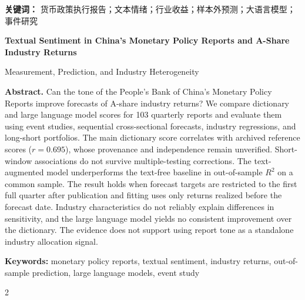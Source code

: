\documentclass[UTF8,zihao=-4,fontset=fandol,a4paper]{ctexart}
\begin{document}
\noindent\textbf{关键词：} 货币政策执行报告；文本情绪；行业收益；样本外预测；大语言模型；事件研究

\vspace{0.9em}
\begin{center}
  {\large\bfseries Textual Sentiment in China's Monetary Policy Reports and A-Share Industry Returns}\par
  \vspace{0.2em}
  {\normalsize Measurement, Prediction, and Industry Heterogeneity}
\end{center}
\noindent\textbf{Abstract.}
Can the tone of the People's Bank of China's Monetary Policy Reports improve forecasts of A-share industry returns? We compare dictionary and large language model scores for 103 quarterly reports and evaluate them using event studies, sequential cross-sectional forecasts, industry regressions, and long-short portfolios. The main dictionary score correlates with archived reference scores ($r=0.695$), whose provenance and independence remain unverified. Short-window associations do not survive multiple-testing corrections. The text-augmented model underperforms the text-free baseline in out-of-sample $R^2$ on a common sample. The result holds when forecast targets are restricted to the first full quarter after publication and fitting uses only returns realized before the forecast date. Industry characteristics do not reliably explain differences in sensitivity, and the large language model yields no consistent improvement over the dictionary. The evidence does not support using report tone as a standalone industry allocation signal.

\noindent\textbf{Keywords:} monetary policy reports, textual sentiment, industry returns, out-of-sample prediction, large language models, event study

\clearpage
\tableofcontents
\vspace{1em}
\begingroup
\small
\setlength{\columnsep}{1.7em}
\begin{multicols}{2}
  \listoffigures
  \listoftables
\end{multicols}
\endgroup
\clearpage
{}




\FloatBarrier

\FloatBarrier
\clearpage
\printbibliography[heading=bibintoc,title={参考文献}]
\clearpage

\end{document}
